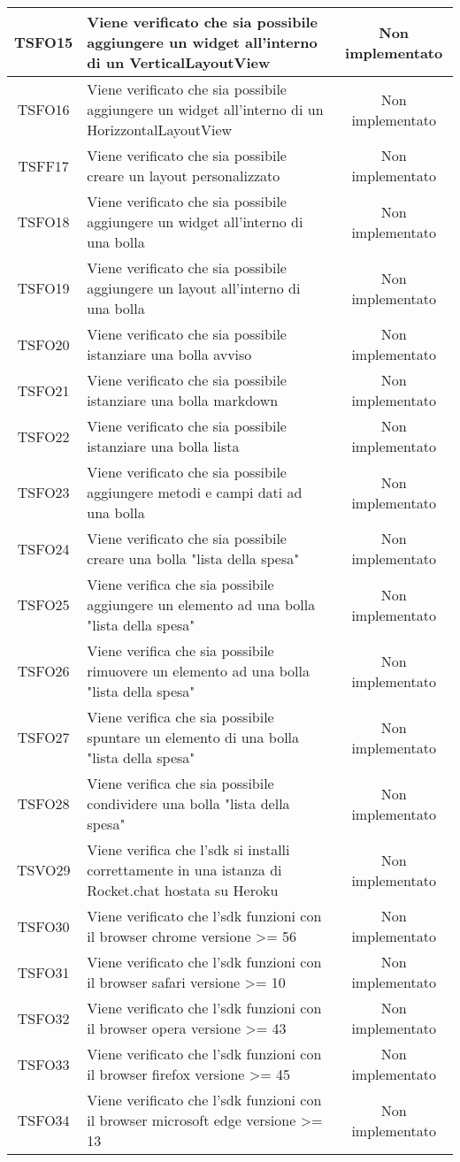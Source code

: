 \begin{center}
\begin{longtable}{|c|>{\centering}m{10cm}|c|}
		TSFO15 & Viene verificato che sia possibile aggiungere un widget all'interno di un VerticalLayoutView & Non implementato \\ \hline
		TSFO16 & Viene verificato che sia possibile aggiungere un widget all'interno di un HorizzontalLayoutView & Non implementato \\ \hline
		TSFF17 & Viene verificato che sia possibile creare un layout personalizzato & Non implementato \\ \hline
		TSFO18 & Viene verificato che sia possibile aggiungere un widget all'interno di una bolla & Non implementato \\ \hline
		TSFO19 & Viene verificato che sia possibile aggiungere un layout all'interno di una bolla & Non implementato \\ \hline
		TSFO20 & Viene verificato che sia possibile istanziare una bolla avviso & Non implementato \\ \hline
		TSFO21 & Viene verificato che sia possibile istanziare una bolla markdown & Non implementato \\ \hline
		TSFO22 & Viene verificato che sia possibile istanziare una bolla lista & Non implementato \\ \hline
		TSFO23 & Viene verificato che sia possibile aggiungere metodi e campi dati ad una bolla & Non implementato \\ \hline
		TSFO24 & Viene verificato che sia possibile creare una bolla "lista della spesa" & Non implementato \\ \hline
		TSFO25 & Viene verifica che sia possibile aggiungere un elemento ad una bolla "lista della spesa" & Non implementato \\ \hline
		TSFO26 & Viene verifica che sia possibile rimuovere un elemento ad una bolla "lista della spesa" & Non implementato \\ \hline
		TSFO27 & Viene verifica che sia possibile spuntare un elemento di una bolla "lista della spesa" & Non implementato \\ \hline
		TSFO28 & Viene verifica che sia possibile condividere una bolla "lista della spesa" & Non implementato \\ \hline
		TSVO29 & Viene verifica che l'sdk si installi correttamente in una istanza di Rocket.chat hostata su Heroku & Non implementato \\ \hline
		TSFO30 & Viene verificato che l'sdk funzioni con il browser chrome versione >= 56 & Non implementato \\ \hline
		TSFO31 & Viene verificato che l'sdk funzioni con il browser safari versione >= 10 & Non implementato \\ \hline
		TSFO32 & Viene verificato che l'sdk funzioni con il browser opera versione >= 43 & Non implementato \\ \hline
		TSFO33 & Viene verificato che l'sdk funzioni con il browser firefox versione >= 45 & Non implementato \\ \hline
		TSFO34 & Viene verificato che l'sdk funzioni con il browser microsoft edge versione >= 13 & Non implementato \\ \hline
	\end{longtable}
\end{center}
